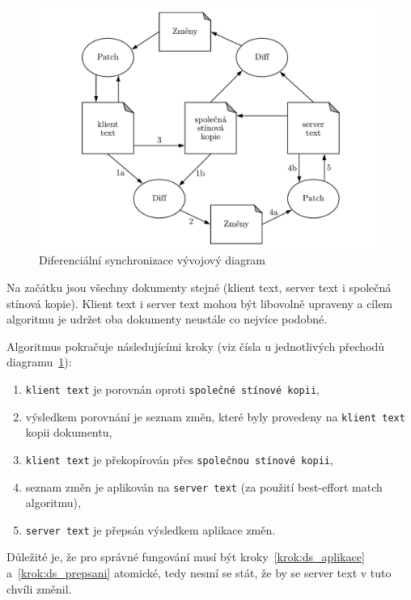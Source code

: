 \begin{figure}[ht]
    \centering
    \includegraphics[width=\textwidth]{partials/analyza/DS_diagram.pdf}
    \caption{Diferenciální synchronizace vývojový diagram~\cite{ds:neil_paper}}\label{fig:DS_diagram}
\end{figure}

Na začátku jsou všechny dokumenty stejné (klient text, server text i společná stínová kopie).
Klient text i server text mohou být libovolně upraveny a cílem algoritmu je udržet oba dokumenty neustále co nejvíce podobné.

Algoritmus pokračuje následujícími kroky (viz čísla u jednotlivých přechodů diagramu~\ref{fig:DS_diagram}):
\begin{enumerate}
    \item \texttt{klient text} je porovnán oproti \texttt{společné stínové kopii},
    \item výsledkem porovnání je seznam změn, které byly provedeny na \texttt{klient text} kopii dokumentu,
    \item \texttt{klient text} je překopírován přes \texttt{společnou stínové kopii},
    \item seznam změn je aplikován na \texttt{server text} (za použití best-effort match algoritmu),\label{krok:ds_aplikace}
    \item \texttt{server text} je přepsán výsledkem aplikace změn.\label{krok:ds_prepsani}
\end{enumerate}

Důležité je, že pro správné fungování musí být kroky~\ref{krok:ds_aplikace} a~\ref{krok:ds_prepsani} atomické, tedy nesmí se stát, že by se server text v tuto chvíli změnil.

